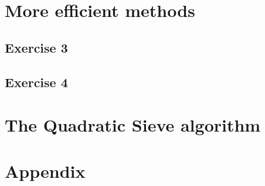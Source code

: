 \documentclass{article}
\begin{document}
\section{More efficient methods}

\subsection{Exercise 3}

\subsection{Exercise 4}

\section{The Quadratic Sieve algorithm}

\section{Appendix}
\end{document}
